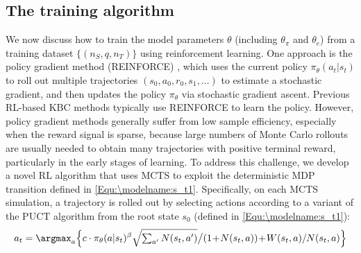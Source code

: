 \documentclass{article}
\begin{document}
	
	
	
	
	\subsection{The training algorithm}
	\label{Sec:\modelname:Training}
	
	
	We now discuss how to train the model parameters $\theta$ (including $\theta_{\pi}$ and $\theta_e$) from a training dataset $\{(n_S,q,n_T)\}$ using reinforcement learning. One approach is the policy gradient method (REINFORCE) \cite{williams1992simple,sutton2000policy}, which uses the current policy $\pi_{\theta}(a_t|s_t)$ to roll out multiple trajectories $(s_0, a_0, r_0, s_1,\ldots)$ to estimate a stochastic gradient, and then updates the policy $\pi_{\theta}$ via stochastic gradient ascent. Previous RL-based KBC methods \cite{DeepPath,GoforaWalk} typically use REINFORCE to learn the policy. However, policy gradient methods generally suffer from low sample efficiency, especially when the reward signal is sparse, because large numbers of Monte Carlo rollouts are usually needed to obtain many trajectories with positive terminal reward, particularly in the early stages of learning. To address this challenge, we develop a novel RL algorithm that uses MCTS to exploit the deterministic MDP transition defined in \eqref{Equ:\modelname:s_t1}. Specifically, on each MCTS simulation, a trajectory is rolled out by selecting actions according to a variant of the PUCT algorithm \cite{Rosin2011, silver2017mastering} from the root state $s_0$ (defined in \eqref{Equ:\modelname:s_t1}):
    	\begin{align}
        	a_t     =
        	            \argmax_a
        	            \Big\{ 
        	                c \cdot \pi_{\theta}(a | s_t)^{\beta}
        	                \sqrt{
        	                    \textstyle \sum_{a'} N(s_t, a')
        	                    }
        	                \big/
        	                (1 \!+\! N(s_t, a)) 
        	                \!+\! 
        	                W(s_t, a)/N(s_t, a)
        	            \Big\}	   	%
    	\label{Equ:\modelname:PUCT}
    	\end{align}
\end{document}
